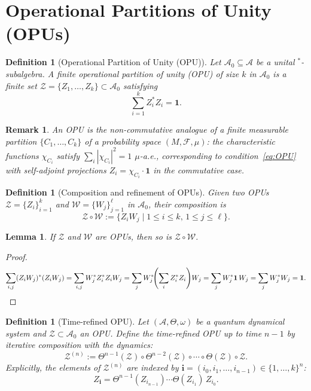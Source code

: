 \documentclass[12pt,a4paper]{article}
\newtheorem{lemma}[theorem]{Lemma}
\newtheorem{definition}[theorem]{Definition}
\newtheorem{remark}[theorem]{Remark}
\newcommand{\A}{\mathcal{A}}
\begin{document}
\section{Operational Partitions of Unity (OPUs)}

\begin{definition}[Operational Partition of Unity (OPU)]
\label{def:OPU}
Let $\A_0\subseteq\A$ be a unital $^*$-subalgebra.  A \emph{finite operational
partition of unity (OPU) of size $k$} in $\A_0$ is a finite set
$\mathcal{Z}=\{Z_1,\ldots,Z_k\}\subset\A_0$ satisfying
\begin{equation}\label{eq:OPU}
  \sum_{i=1}^k Z_i^* Z_i = \mathbf{1}.
\end{equation}
\end{definition}

\begin{remark}
An OPU is the non-commutative analogue of a finite measurable partition
$\{C_1,\ldots,C_k\}$ of a probability space $(M,\mathscr{F},\mu)$: the
characteristic functions $\chi_{C_i}$ satisfy $\sum_i |\chi_{C_i}|^2 = 1$
$\mu$-a.e., corresponding to condition~\eqref{eq:OPU} with self-adjoint
projections $Z_i = \chi_{C_i}\cdot\mathbf{1}$ in the commutative case.
\end{remark}

\begin{definition}[Composition and refinement of OPUs]
\label{def:OPU_compose}
Given two OPUs $\mathcal{Z}=\{Z_i\}_{i=1}^k$ and $\mathcal{W}=\{W_j\}_{j=1}^\ell$
in $\A_0$, their \emph{composition} is
\[
  \mathcal{Z}\circ\mathcal{W} := \{Z_i W_j \mid 1\leq i\leq k,\,1\leq j\leq\ell\}.
\]
\end{definition}

\begin{lemma}
If $\mathcal{Z}$ and $\mathcal{W}$ are OPUs, then so is $\mathcal{Z}\circ\mathcal{W}$.
\end{lemma}
\begin{proof}
\[
  \sum_{i,j}(Z_i W_j)^*(Z_i W_j)
  = \sum_{i,j} W_j^* Z_i^* Z_i W_j
  = \sum_j W_j^*\!\!\left(\sum_i Z_i^* Z_i\right)\!W_j
  = \sum_j W_j^* \mathbf{1}\, W_j
  = \sum_j W_j^* W_j = \mathbf{1}.\qedhere
\]
\end{proof}

\begin{definition}[Time-refined OPU]
\label{def:refined_OPU}
Let $(\A,\Theta,\omega)$ be a quantum dynamical system and
$\mathcal{Z}\subset\A_0$ an OPU.  Define the \emph{time-refined OPU} up to
time $n-1$ by iterative composition with the dynamics:
\begin{equation}\label{eq:refined_OPU}
  \mathcal{Z}^{(n)} :=
  \Theta^{n-1}(\mathcal{Z})\circ\Theta^{n-2}(\mathcal{Z})\circ\cdots\circ
  \Theta(\mathcal{Z})\circ\mathcal{Z}.
\end{equation}
Explicitly, the elements of $\mathcal{Z}^{(n)}$ are indexed by
$\mathbf{i}=(i_0,i_1,\ldots,i_{n-1})\in\{1,\ldots,k\}^n$:
\[
  Z_{\mathbf{i}} = \Theta^{n-1}(Z_{i_{n-1}})\cdots\Theta(Z_{i_1})\,Z_{i_0}.
\]
\end{definition}
\end{document}
